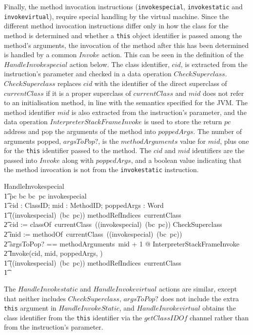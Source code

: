 Finally, the method invocation instructions (\texttt{invokespecial},
\texttt{invokestatic} and \texttt{invokevirtual}), require special
handling by the virtual machine.
Since the different method invocation instructions differ only in how
the class for the method is determined and whether a \texttt{this}
object identifier is passed among the method's arguments, the
invocation of the method after this has been determined is handled by
a common $Invoke$ action.
This can be seen in the definition of the $HandleInvokespecial$ action
below.
The class identifier, $cid$, is extracted from the instruction's
parameter and checked in a data operation $CheckSuperclass$.
$CheckSuperclass$ replaces $cid$ with the identifier of the direct
superclass of $currentClass$ if it is a proper superclass of
$currentClass$ and $mid$ does not refer to an initialisation method,
in line with the semantics specified for the JVM. 
The method identifier $mid$ is also extracted from the instruction's
parameter, and the data operation $InterpreterStackFrameInvoke$ is
used to store the return $pc$ address and pop the arguments of the
method into $poppedArgs$.
The number of arguments popped, $argsToPop?$, is the $methodArguments$
value for $mid$, plus one for the \texttt{this} identifier passed to
the method.
The $cid$ and $mid$ identifiers are the passed into $Invoke$ along
with $poppedArgs$, and a boolean value indicating that the method
invocation is not from the \texttt{invokestatic} instruction.
\begin{circusaction}
  HandleInvokespecial \circdef \\
  \t1 \lcircguard pc \in \dom bc \land bc~pc \in \ran invokespecial \rcircguard \circguard \\
  \t1 \circvar cid : ClassID; mid : MethodID; poppedArgs : \seq Word \circspot \\
  \t1 \circif ((invokespecial\inv)~(bc~pc)) \in methodRefIndices~currentClass \circthen {} \\
  \t2 cid := classOf~currentClass~((invokespecial\inv)~(bc~pc)) \circseq \lschexpract CheckSuperclass \rschexpract \circseq \\
  \t2 mid := methodOf~currentClass~((invokespecial\inv)~(bc~pc)) \circseq \\
  \t2 \lschexpract \exists argsToPop? == methodArguments~mid + 1 @ InterpreterStackFrameInvoke \rschexpract \circseq \\
  \t2 Invoke(cid, mid, poppedArgs, \false) \\
  \t1 {} \circelse ((invokespecial\inv)~(bc~pc)) \notin methodRefIndices~currentClass \circthen \Chaos \\
  \t1 \circfi
\end{circusaction}
The $HandleInvokestatic$ and $HandleInvokevirtual$ actions are
similar, except that neither includes $CheckSuperclass$, $argsToPop?$
does not include the extra \texttt{this} argument in
$HandleInvokeStatic$, and $HandleInvokevirtual$ obtains the class
identifier from the \texttt{this} identifier via the $getClassIDOf$
channel rather than from the instruction's parameter.

